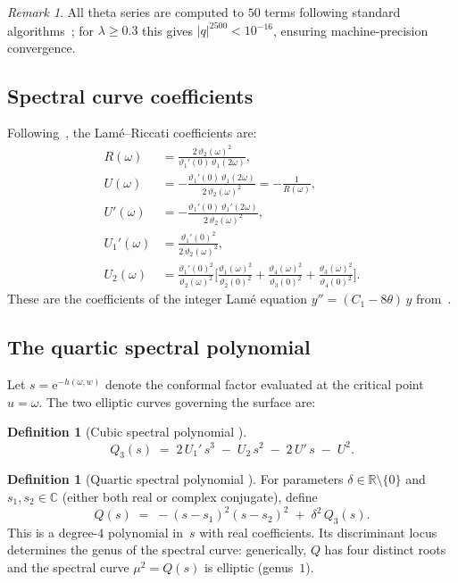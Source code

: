 \documentclass[11pt,a4paper]{article}
\theoremstyle{plain}
\theoremstyle{definition}
\newtheorem{definition}[theorem]{Definition}
\theoremstyle{remark}
\newtheorem{remark}[theorem]{Remark}
\newcommand{\vt}[1]{\vartheta_{#1}}     %
\newcommand{\CC}{\mathbb{C}}
\newcommand{\RR}{\mathbb{R}}
\newcommand{\ee}{\mathrm{e}}
\newcommand{\abs}[1]{\lvert #1 \rvert}
\begin{document}
\begin{remark}
  All theta series are computed to $50$ terms following
  standard algorithms~\cite{Dee11}; for
  $\lambda \geq 0.3$ this gives $\abs{q}^{2500} < 10^{-16}$, ensuring
  machine-precision convergence.
\end{remark}

\subsection{Spectral curve coefficients}\label{sec:coeff}
Following~\cite[Section~3.2]{BHS-comp}, the Lam\'e--Riccati
coefficients are:
\begin{align}
  R(\omega) &= \frac{2\,\vt{2}(\omega)^2}
    {\vt{1}'(0)\,\vt{1}(2\omega)},
  \label{eq:Romega} \\
  U(\omega) &= -\frac{\vt{1}'(0)\,\vt{1}(2\omega)}
    {2\,\vt{2}(\omega)^2}
  = -\frac{1}{R(\omega)},
  \label{eq:U} \\
  U'(\omega) &= -\frac{\vt{1}'(0)\,\vt{1}'(2\omega)}
    {2\,\vt{2}(\omega)^2},
  \label{eq:Uprime} \\
  U_1'(\omega) &= \frac{\vt{1}'(0)^2}
    {2\,\vt{2}(\omega)^2},
  \label{eq:U1prime} \\
  U_2(\omega) &= \frac{\vt{1}'(0)^2}{\vt{2}(\omega)^2}
    \biggl[
      \frac{\vt{1}(\omega)^2}{\vt{2}(0)^2}
    + \frac{\vt{4}(\omega)^2}{\vt{3}(0)^2}
    + \frac{\vt{3}(\omega)^2}{\vt{4}(0)^2}
    \biggr].
  \label{eq:U2}
\end{align}
These are the coefficients of the integer Lam\'e equation
$y'' = (C_1 - 8\theta)\,y$ from~\cite[Lemma~1]{BHS-comp}.

\subsection{The quartic spectral polynomial}\label{sec:Q}
Let $s = \ee^{-h(\omega,w)}$ denote the conformal factor evaluated at
the critical point $u=\omega$.  The two elliptic curves governing the
surface are:

\begin{definition}[Cubic spectral polynomial {\cite[Eq.~58]{BHS-comp}}]
\label{def:Q3}
\begin{equation}
  Q_3(s) \;=\; 2\,U_1'\,s^3 \;-\; U_2\,s^2
    \;-\; 2\,U'\,s \;-\; U^2.
  \label{eq:Q3}
\end{equation}
\end{definition}

\begin{definition}[Quartic spectral polynomial
  {\cite[Theorem~9]{BHS-comp}}]
\label{def:Q}
For parameters $\delta \in \RR \setminus \{0\}$ and
$s_1, s_2 \in \CC$ (either both real or complex conjugate), define
\begin{equation}
  Q(s) \;=\; -(s - s_1)^2(s - s_2)^2 \;+\; \delta^2\,Q_3(s).
  \label{eq:Q}
\end{equation}
This is a degree-$4$ polynomial in~$s$ with real coefficients.  Its
discriminant locus determines the genus of the spectral curve:
generically, $Q$ has four distinct roots and the spectral curve
$\mu^2 = Q(s)$ is elliptic (genus~$1$).
\end{definition}
\end{document}
